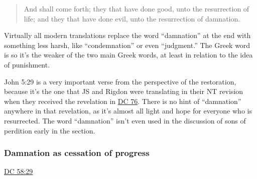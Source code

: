 			\begin{quote}
				And shall come forth; they that have done good, unto the resurrection of life; and they that have done evil, unto the resurrection of damnation.
			\end{quote}
			
		Virtually all modern translations replace the word ``damnation'' at the end with something less harsh, like ``condemnation'' or even ``judgment.'' The Greek word is  so it's the weaker of the two main Greek words, at least in relation to the idea of punishment.
		
		John 5:29 is a very important verse from the perspective of the restoration, because it's the one that JS and Rigdon were translating in their NT revision when they received the revelation in \hyperref[DC76]{DC 76}. There is no hint of ``damnation'' anywhere in that revelation, as it's almost all light and hope for everyone who is resurrected. The word ``damnation'' isn't even used in the discussion of sons of perdition early in the section.
		
	\subsubsection{Damnation as cessation of progress}
		\label{DAMNATION-progress}
		
		\begin{compactitem}
			\item \hyperref[DC58-29]{DC 58:29}
		\end{compactitem}